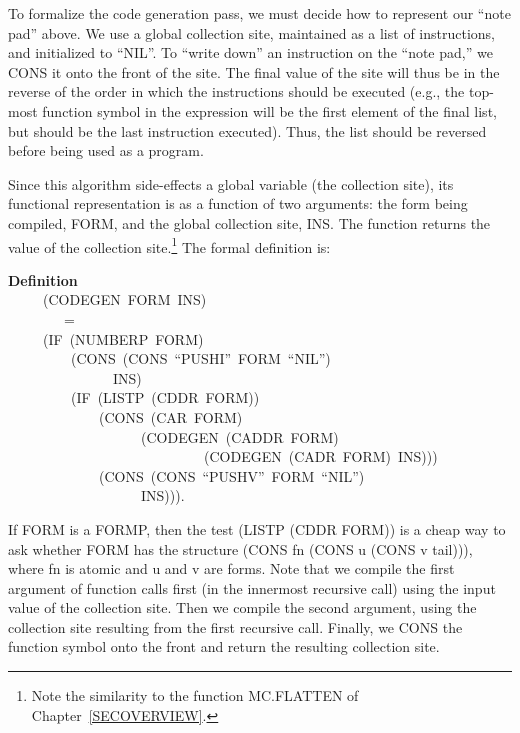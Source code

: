 \documentclass[10pt]{book}
\newenvironment{pubasis}{\begin{flushleft}}{\end{flushleft}}
\newcommand{\axiomordefinition}[1]{\vspace{6pt}\Large\textsf{\textbf{#1}}\normalsize}
\begin{document}
To formalize the code generation pass, we must   decide how to represent our
``note pad'' above.  We  use a global
collection site, maintained as a list of instructions, and initialized to ``NIL''.
To ``write down'' an instruction on the ``note pad,'' we CONS it onto the front of the site.
The final value of the site
will thus be in the reverse of the order in which the instructions
should be executed (e.g., the top-most function symbol in
the expression will be the first element of the final list, but should
be the last instruction executed).  Thus, the list should be reversed
before being used as a program.

Since this algorithm side-effects a global variable (the collection site),
its functional representation is as a function of two arguments: the form being
compiled, FORM, and the global collection site, INS.  The function returns
the value of the collection site.\footnote{Note the similarity to the function MC.FLATTEN of Chapter~\ref{SECOVERVIEW}.}  The formal definition is:

\begin{pubasis}
\axiomordefinition{Definition}\\
~~~~~(CODEGEN~FORM~INS)\\
~~~~~~~~=\\
~~~~~(IF~(NUMBERP~FORM)\\
~~~~~~~~~(CONS~(CONS~``PUSHI''~FORM~``NIL'')\\
~~~~~~~~~~~~~~~INS)\\
~~~~~~~~~(IF~(LISTP~(CDDR~FORM))\\
~~~~~~~~~~~~~(CONS~(CAR~FORM)\\
~~~~~~~~~~~~~~~~~~~(CODEGEN~(CADDR~FORM)\\
~~~~~~~~~~~~~~~~~~~~~~~~~~~~(CODEGEN~(CADR~FORM)~INS)))\\
~~~~~~~~~~~~~(CONS~(CONS~``PUSHV''~FORM~``NIL'')\\
~~~~~~~~~~~~~~~~~~~INS))).\\
\end{pubasis}
If FORM is a FORMP, then
the test (LISTP (CDDR FORM)) is   a cheap way to ask whether FORM has
the structure (CONS fn (CONS u (CONS v tail))), where fn is atomic and u and v
are forms.  Note that we compile the first argument of function calls
first (in the innermost recursive call) using the input value of the
collection site.  Then we compile the second argument, using the collection
site resulting from the first recursive call.  Finally, we CONS the function
symbol onto the front and return the resulting collection site.
\end{document}
